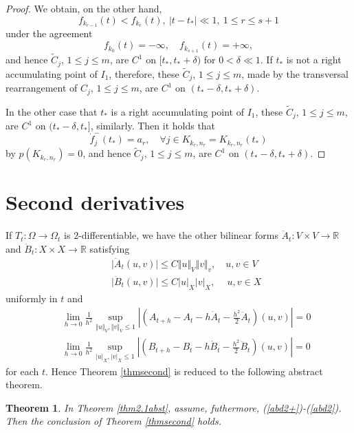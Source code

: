 \documentclass[final,a4paper]{jmsj}
\newcommand{\R}{\mathbb R}
\theoremstyle{thmstyleone}%
\newtheorem{theorem}{Theorem}
\theoremstyle{thmstyletwo}%
\theoremstyle{thmstylethree}%
\begin{document}
\begin{proof}
We obtain, on the other hand,  
\[ f_{k_{r-1}}(t)<f_{k_r}(t), \ \vert t-t_\ast\vert\ll 1, \ 1\leq r\leq s+1 \] 
under the agreement 
\[ f_{k_0}(t)=-\infty, \quad f_{k_{s+1}}(t)=+\infty, \] 
and hence $\tilde C_j$, $1\leq j\leq m$, are $C^1$ on $[t_\ast, t_\ast+\delta)$ for $0<\delta \ll 1$. If $t_\ast$ is not a right accumulating point of $I_1$, therefore, these $\tilde C_j$, $1\leq j\leq m$, made by the transversal rearrangement of $C_j$, $1\leq j\leq m$, are $C^1$ on $(t_\ast-\delta, t_\ast+\delta)$. 

In the other case that $t_\ast$ is a right accumulating point of $I_1$, these $\tilde C_j$, $1\leq j\leq m$, are $C^1$ on $(t_\ast-\delta, t_\ast]$, similarly. Then it holds that  
\[ \dot f_j^-(t_\ast)=a_r, \quad \forall j\in K_{k_r, n_r}=K_{k_r,n_r}(t_\ast) \] 
by $p(K_{k_r,n_r})=0$, and hence $\tilde C_j$, $1\leq j\leq m$, are $C^1$ on $(t_\ast-\delta, t_\ast+\delta)$. 
\end{proof} 


\section{Second derivatives} \label{sec6}

If $T_t:\Omega\rightarrow \Omega_t$ is $2$-differentiable, we have the other bilinear forms $\ddot A_t:V\times V\rightarrow \R$ and $\ddot B_t:X\times X\rightarrow \R$ satisfying 
\begin{eqnarray} 
& & \vert \ddot A_t(u,v)\vert \leq C\Vert u\Vert_V\Vert v\Vert_v, \quad u,v\in V \nonumber\\ 
& & \vert \ddot B_t(u,v)\vert \leq C\vert u\vert_X\vert v\vert_X, \quad \ u,v\in X 
 \label{abd2+} 
\end{eqnarray} 
uniformly in $t$ and 
\begin{eqnarray} 
& & \lim_{h\rightarrow 0}\frac{1}{h^2}\sup_{\Vert u\Vert_V, \Vert v\Vert_V\leq 1}\left\vert \left(A_{t+h}-A_t-h\dot A_t-\frac{h^2}{2}\ddot A_t\right)(u,v)\right\vert=0 \nonumber\\ 
& & \lim_{h\rightarrow 0} \frac{1}{h^2}\sup_{\vert u\vert_X, \vert v\vert_X \leq 1}\left\vert \left( B_{t+h}-B_t-h\dot B_t-\frac{h^2}{2}\ddot B_t\right)(u,v)\right\vert =0 
 \label{abd2}
\end{eqnarray} 
for each $t$. Hence Theorem \ref{thmsecond} is reduced to the following abstract theorem. 

\begin{theorem}\label{secondabst}
In Theorem \ref{thm2.1abst}, assume, futhermore, (\ref{abd2+})-(\ref{abd2}). Then the conclusion of Theorem \ref{thmsecond} holds. 
\end{theorem}
\end{document}
